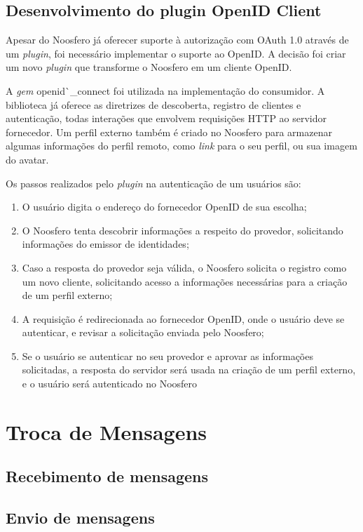 \subsection{Desenvolvimento do plugin OpenID Client}

Apesar do Noosfero já oferecer suporte à autorização com OAuth 1.0 através de um
\textit{plugin}, foi necessário implementar o suporte ao OpenID. A decisão foi criar
um novo \textit{plugin} que transforme o Noosfero em um cliente OpenID.

A \textit{gem} openid\char\`_connect foi utilizada na implementação do consumidor. A
biblioteca já oferece as diretrizes de descoberta, registro de clientes e
autenticação, todas interações que envolvem requisições HTTP ao servidor fornecedor.
Um perfil externo também é criado no Noosfero para armazenar algumas informações do
perfil remoto, como \textit{link} para o seu perfil, ou sua imagem do avatar.

Os passos realizados pelo \textit{plugin} na autenticação de um usuários são:

\begin{enumerate}
  \item{O usuário digita o endereço do fornecedor OpenID de sua escolha;}
  \item{O Noosfero tenta descobrir informações a respeito do provedor, solicitando
        informações do emissor de identidades;}
  \item{Caso a resposta do provedor seja válida, o Noosfero solicita o registro como
        um novo cliente, solicitando acesso a informações necessárias para a criação
        de um perfil externo;}
  \item{A requisição é redirecionada ao fornecedor OpenID, onde o usuário deve se
        autenticar, e revisar a solicitação enviada pelo Noosfero;}
  \item{Se o usuário se autenticar no seu provedor e aprovar as informações
        solicitadas, a resposta do servidor será usada na criação de um perfil
        externo, e o usuário será autenticado no Noosfero}
\end{enumerate}

\section{Troca de Mensagens}



\subsection{Recebimento de mensagens}



\subsection{Envio de mensagens}


